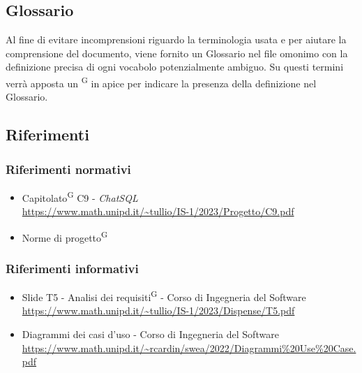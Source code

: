\subsection{Glossario}
Al fine di evitare incomprensioni riguardo la terminologia usata e per aiutare la comprensione del documento, viene fornito un Glossario nel file omonimo con la definizione precisa di ogni vocabolo potenzialmente ambiguo. Su questi termini verrà apposta un \textsuperscript{G} in apice per indicare la presenza della definizione nel Glossario.

\subsection{Riferimenti}
\subsubsection{Riferimenti normativi}
\begin{itemize}
	\item Capitolato\textsuperscript{G} C9 - \textit{ChatSQL} \\ \url{https://www.math.unipd.it/~tullio/IS-1/2023/Progetto/C9.pdf}
	\item Norme di progetto\textsuperscript{G}
\end{itemize}

\subsubsection{Riferimenti informativi}
\begin{itemize}
	\item Slide T5 - Analisi dei requisiti\textsuperscript{G} - Corso di Ingegneria del Software \\ \url{https://www.math.unipd.it/~tullio/IS-1/2023/Dispense/T5.pdf}
	\item Diagrammi dei casi d'uso - Corso di Ingegneria del Software \\ \url{https://www.math.unipd.it/~rcardin/swea/2022/Diagrammi%20Use%20Case.pdf}
\end{itemize}